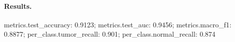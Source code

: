 \paragraph{Results.} metrics.test\_accuracy: 0.9123; metrics.test\_auc: 0.9456; metrics.macro\_f1: 0.8877; per\_class.tumor\_recall: 0.901; per\_class.normal\_recall: 0.874
